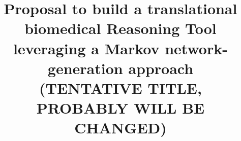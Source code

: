 \documentclass[11pt,notitlepage]{article}
\begin{document}
\title{Proposal to build a translational biomedical Reasoning Tool leveraging a Markov network-generation approach\\
  (TENTATIVE TITLE, PROBABLY WILL BE CHANGED)}
\date{}
\author{}
\maketitle
\vspace{-0.5in}
\thispagestyle{plain}




\end{document}

